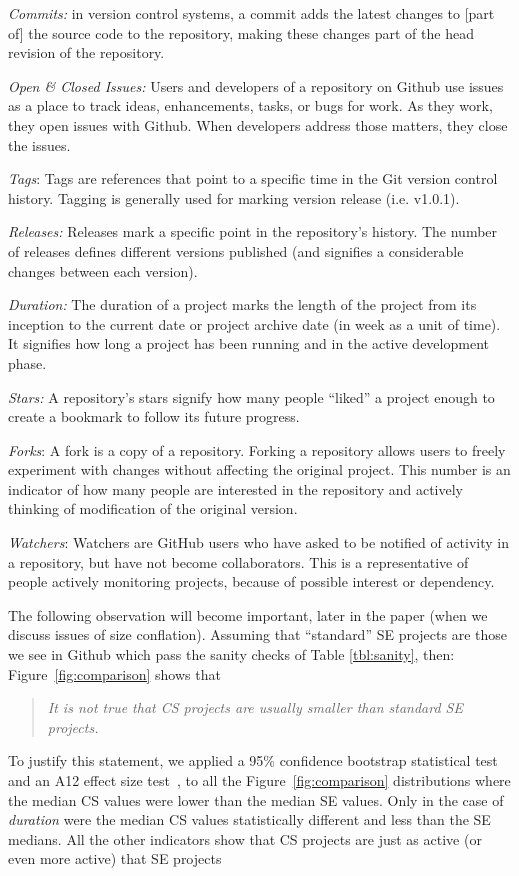 \documentclass[sigconf,review,anonymous]{acmart}
\begin{document}
  

\textit{Commits:} in version control systems, a commit adds the latest changes to [part of] the source code to the repository, making these changes part of the head revision of the repository. 

\textit{Open \& Closed Issues:} Users and developers of a repository on Github use issues as a place to track ideas, enhancements, tasks, or bugs for work. As they work, they open issues with Github. When developers address those matters, they close the issues.

\textit{Tags}: Tags are references that point to a specific time in the Git version control history. Tagging is generally used for marking version release (i.e. v1.0.1).


\textit{Releases:} Releases mark a specific point in the repository’s history. The number of releases defines different versions published (and  signifies a considerable  changes  between each version).

\textit{Duration:} The duration of a project marks the length of the project from its inception to the current date or project archive date (in week as a unit of time). It signifies how long a project has been running and in the active development phase.





\textit{Stars:} A repository's stars signify how many people
  ``liked'' a project enough to create a bookmark to follow its future progress.
  
   \textit{Forks}: A fork is a copy of a repository. Forking a repository allows users to freely experiment with changes without affecting the original project. This number
  is an indicator of how many people are interested in the repository and actively thinking
  of modification of the original version.
  
   \textit{Watchers}: Watchers are GitHub users who have asked to be notified of activity in a repository, but have not become collaborators. This is a representative of people actively monitoring projects, because of possible interest or dependency.
   
  
  The following observation  
  will become important, later in the paper (when we discuss issues of size conflation).
Assuming that ``standard'' SE projects are those we see in Github which pass the sanity checks of Table \ref{tbl:sanity}, then:
 Figure~\ref{fig:comparison} shows that
  \begin{quote}
  {\em It is not true that CS projects are usually smaller than standard SE projects.}
  \end{quote}
 To justify this statement, we applied 
  a 95\% confidence bootstrap statistical test~\cite{efron94} and an A12 effect size test~\cite{arcuri2011practical}, to all the  Figure~\ref{fig:comparison} distributions where the median CS values were lower than the median SE values.
Only in the case of {\em duration} were the median CS values statistically different and less than the SE medians. All the other indicators show that CS projects are just as active (or even more active) that SE projects 
\end{document}
